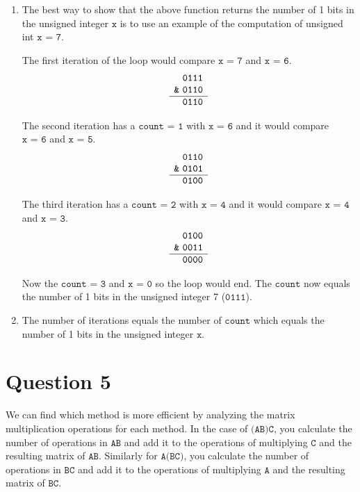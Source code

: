 \documentclass[letterpaper, 12pt]{article}
\begin{document}
\begin{enumerate}
    \item The best way to show that the above function returns the number of 1 bits in the unsigned integer $\texttt{x}$ is to use an example of the computation of unsigned int $\texttt{x = 7}$.
    
    
    The first iteration of the loop would compare $\texttt{x = 7}$ and $\texttt{x = 6}$.
    \[\begin{array}[t]{r}
        \texttt{0111}\\
    \texttt{\&} \ \texttt{0110}\\ \hline
        \texttt{0110}
    \end{array}\]
    
    The second iteration has a $\texttt{count = 1}$ with $\texttt{x = 6}$ and it would compare $\texttt{x = 6}$ and $\texttt{x = 5}$.
    \[\begin{array}[t]{r}
        \texttt{0110}\\
    \texttt{\&} \ \texttt{0101}\\ \hline
        \texttt{0100}
    \end{array}\]
    
    The third iteration has a $\texttt{count = 2}$ with $\texttt{x = 4}$ and it would compare $\texttt{x = 4}$ and $\texttt{x = 3}$.
    \[\begin{array}[t]{r}
        \texttt{0100}\\
    \texttt{\&} \ \texttt{0011}\\ \hline
        \texttt{0000}
    \end{array}\]
    
    Now the $\texttt{count = 3}$ and $\texttt{x = 0}$ so the loop would end. The $\texttt{count}$ now equals the number of 1 bits in the unsigned integer 7 ($\texttt{0111}$).
    
    \item The number of iterations equals the number of $\texttt{count}$ which equals the number of 1 bits in the unsigned integer $\texttt{x}$.
\end{enumerate}

\section*{Question 5}
We can find which method is more efficient by analyzing the matrix multiplication operations for each method. In the case of $\texttt{(AB)C}$, you calculate the number of operations in $\texttt{AB}$ and add it to the operations of multiplying $\texttt{C}$ and the resulting matrix of $\texttt{AB}$. Similarly for $\texttt{A(BC)}$, you calculate the number of operations in $\texttt{BC}$ and add it to the operations of multiplying $\texttt{A}$ and the resulting matrix of $\texttt{BC}$.
\end{document}
